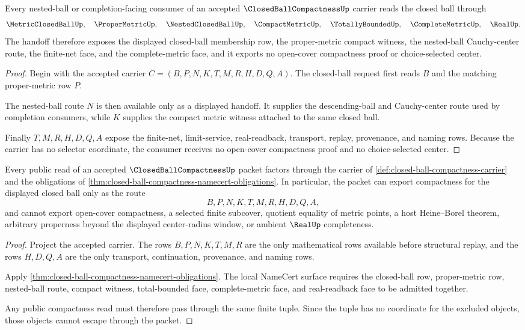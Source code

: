 \begin{theorem}
\label{thm:closed-ball-compactness-nested-ball-handoff}
Every nested-ball or completion-facing consumer of an accepted $\ClosedBallCompactnessUp$ carrier reads the closed ball through
$$
\MetricClosedBallUp,\quad \ProperMetricUp,\quad \NestedClosedBallUp,\quad \CompactMetricUp,\quad \TotallyBoundedUp,\quad \CompleteMetricUp,\quad \RealUp .
$$
The handoff therefore exposes the displayed closed-ball membership row, the proper-metric compact witness, the nested-ball Cauchy-center route, the finite-net face, and the complete-metric face, and it exports no open-cover compactness proof or choice-selected center.
\end{theorem}
\begin{proof}
Begin with the accepted carrier $C=(B,P,N,K,T,M,R,H,D,Q,A)$. The closed-ball request first reads $B$ and the matching proper-metric row $P$.

The nested-ball route $N$ is then available only as a displayed handoff. It supplies the descending-ball and Cauchy-center route used by completion consumers, while $K$ supplies the compact metric witness attached to the same closed ball.

Finally $T,M,R,H,D,Q,A$ expose the finite-net, limit-service, real-readback, transport, replay, provenance, and naming rows. Because the carrier has no selector coordinate, the consumer receives no open-cover compactness proof and no choice-selected center.
\end{proof}

\begin{theorem}
\label{thm:closed-ball-compactness-nonescape}
Every public read of an accepted $\ClosedBallCompactnessUp$ packet factors through the carrier of \autoref{def:closed-ball-compactness-carrier} and the obligations of \autoref{thm:closed-ball-compactness-namecert-obligations}. In particular, the packet can export compactness for the displayed closed ball only as the route
$$
B,P,N,K,T,M,R,H,D,Q,A,
$$
and cannot export open-cover compactness, a selected finite subcover, quotient equality of metric points, a host Heine--Borel theorem, arbitrary properness beyond the displayed center-radius window, or ambient $\RealUp$ completeness.
\end{theorem}
\begin{proof}
Project the accepted carrier. The rows $B,P,N,K,T,M,R$ are the only mathematical rows available before structural replay, and the rows $H,D,Q,A$ are the only transport, continuation, provenance, and naming rows.

Apply \autoref{thm:closed-ball-compactness-namecert-obligations}. The local NameCert surface requires the closed-ball row, proper-metric row, nested-ball route, compact witness, total-bounded face, complete-metric face, and real-readback face to be admitted together.

Any public compactness read must therefore pass through the same finite tuple. Since the tuple has no coordinate for the excluded objects, those objects cannot escape through the packet.
\end{proof}


